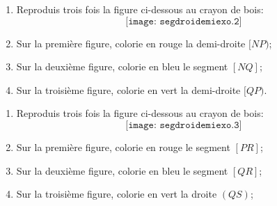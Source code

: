 \begin{myenumerate}
\item
\begin{enumerate}
\item Reproduis trois fois la figure ci-dessous au crayon de bois:
\[\texttt{[image: segdroidemiexo.2]}\]
\item Sur la première figure, colorie en rouge la demi-droite $[NP)$;
\item Sur la deuxième figure, colorie en bleu le segment $[NQ]$;
\item Sur la troisième figure, colorie en vert la demi-droite $[QP)$.
\end{enumerate}
\item
\begin{enumerate}
\item Reproduis trois fois la figure ci-dessous au crayon de bois:
\[\texttt{[image: segdroidemiexo.3]}\]
\item Sur la première figure, colorie en rouge le segment $[PR]$;
\item Sur la deuxième figure, colorie en bleu le segment $[QR]$;
\item Sur la troisième figure, colorie en vert la droite $(QS)$;
\end{enumerate}
\end{myenumerate}
